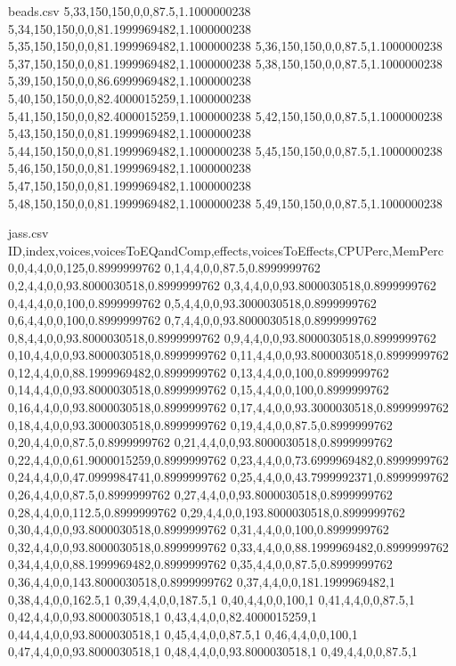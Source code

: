 \begin{filecontents*}{beads.csv}
5,33,150,150,0,0,87.5,1.1000000238
5,34,150,150,0,0,81.1999969482,1.1000000238
5,35,150,150,0,0,81.1999969482,1.1000000238
5,36,150,150,0,0,87.5,1.1000000238
5,37,150,150,0,0,81.1999969482,1.1000000238
5,38,150,150,0,0,87.5,1.1000000238
5,39,150,150,0,0,86.6999969482,1.1000000238
5,40,150,150,0,0,82.4000015259,1.1000000238
5,41,150,150,0,0,82.4000015259,1.1000000238
5,42,150,150,0,0,87.5,1.1000000238
5,43,150,150,0,0,81.1999969482,1.1000000238
5,44,150,150,0,0,81.1999969482,1.1000000238
5,45,150,150,0,0,87.5,1.1000000238
5,46,150,150,0,0,81.1999969482,1.1000000238
5,47,150,150,0,0,81.1999969482,1.1000000238
5,48,150,150,0,0,81.1999969482,1.1000000238
5,49,150,150,0,0,87.5,1.1000000238
\end{filecontents*}

\begin{filecontents*}{jass.csv}
ID,index,voices,voicesToEQandComp,effects,voicesToEffects,CPUPerc,MemPerc
0,0,4,4,0,0,125,0.8999999762
0,1,4,4,0,0,87.5,0.8999999762
0,2,4,4,0,0,93.8000030518,0.8999999762
0,3,4,4,0,0,93.8000030518,0.8999999762
0,4,4,4,0,0,100,0.8999999762
0,5,4,4,0,0,93.3000030518,0.8999999762
0,6,4,4,0,0,100,0.8999999762
0,7,4,4,0,0,93.8000030518,0.8999999762
0,8,4,4,0,0,93.8000030518,0.8999999762
0,9,4,4,0,0,93.8000030518,0.8999999762
0,10,4,4,0,0,93.8000030518,0.8999999762
0,11,4,4,0,0,93.8000030518,0.8999999762
0,12,4,4,0,0,88.1999969482,0.8999999762
0,13,4,4,0,0,100,0.8999999762
0,14,4,4,0,0,93.8000030518,0.8999999762
0,15,4,4,0,0,100,0.8999999762
0,16,4,4,0,0,93.8000030518,0.8999999762
0,17,4,4,0,0,93.3000030518,0.8999999762
0,18,4,4,0,0,93.3000030518,0.8999999762
0,19,4,4,0,0,87.5,0.8999999762
0,20,4,4,0,0,87.5,0.8999999762
0,21,4,4,0,0,93.8000030518,0.8999999762
0,22,4,4,0,0,61.9000015259,0.8999999762
0,23,4,4,0,0,73.6999969482,0.8999999762
0,24,4,4,0,0,47.0999984741,0.8999999762
0,25,4,4,0,0,43.7999992371,0.8999999762
0,26,4,4,0,0,87.5,0.8999999762
0,27,4,4,0,0,93.8000030518,0.8999999762
0,28,4,4,0,0,112.5,0.8999999762
0,29,4,4,0,0,193.8000030518,0.8999999762
0,30,4,4,0,0,93.8000030518,0.8999999762
0,31,4,4,0,0,100,0.8999999762
0,32,4,4,0,0,93.8000030518,0.8999999762
0,33,4,4,0,0,88.1999969482,0.8999999762
0,34,4,4,0,0,88.1999969482,0.8999999762
0,35,4,4,0,0,87.5,0.8999999762
0,36,4,4,0,0,143.8000030518,0.8999999762
0,37,4,4,0,0,181.1999969482,1
0,38,4,4,0,0,162.5,1
0,39,4,4,0,0,187.5,1
0,40,4,4,0,0,100,1
0,41,4,4,0,0,87.5,1
0,42,4,4,0,0,93.8000030518,1
0,43,4,4,0,0,82.4000015259,1
0,44,4,4,0,0,93.8000030518,1
0,45,4,4,0,0,87.5,1
0,46,4,4,0,0,100,1
0,47,4,4,0,0,93.8000030518,1
0,48,4,4,0,0,93.8000030518,1
0,49,4,4,0,0,87.5,1

\end{filecontents*}
